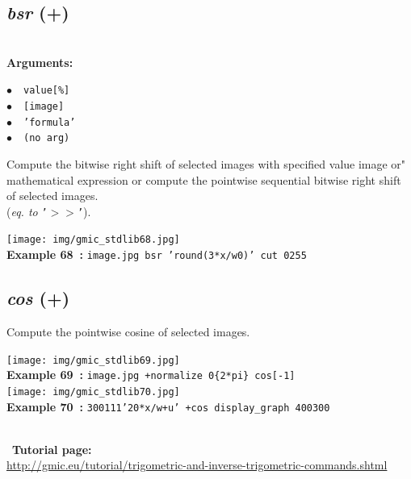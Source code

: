 \documentclass[a4paper,10.5pt,twoside]{book}
\def\comma{\discretionary{,}{}{,}}
\newcommand{\Cb}[1]{\textcolor{cb}{#1}}
\begin{document}
\subsection{\emph{bsr} (+)}\vspace*{-0.7em}
~\\\textbf{\Cb{Arguments: }}\begin{flushleft}
{\small \Cb{\hspace*{0.5cm}$\bullet$~~\texttt{value[\%]}}}~~~\\
{\small \Cb{\hspace*{0.5cm}$\bullet$~~\texttt{[image]}}}~~~\\
{\small \Cb{\hspace*{0.5cm}$\bullet$~~\texttt{'formula'}}}~~~\\
{\small \Cb{\hspace*{0.5cm}$\bullet$~~\texttt{(no arg)}}}\end{flushleft}
Compute the bitwise right shift of selected images with specified value{\comma} image or"
mathematical expression{\comma} or compute the pointwise sequential bitwise right shift of
selected images.
~\\(\emph{eq. to} {\small \texttt{'$>$$>$'}}).
\begin{center}\texttt{[image: img/gmic\_stdlib68.jpg]}\\
{\footnotesize \textbf{Example 68~:} \texttt{image.jpg bsr 'round(3*x/w{\comma}0)' cut 0{\comma}255}}
\end{center}

\subsection{\emph{cos} (+)}\vspace*{-0.7em}
Compute the pointwise cosine of selected images.
\begin{center}\texttt{[image: img/gmic\_stdlib69.jpg]}\\
{\footnotesize \textbf{Example 69~:} \texttt{image.jpg +normalize 0{\comma}\{2*pi\} cos[-1]}}
\\\texttt{[image: img/gmic\_stdlib70.jpg]}\\
{\footnotesize \textbf{Example 70~:} \texttt{300{\comma}1{\comma}1{\comma}1{\comma}'20*x/w+u' +cos display\_graph 400{\comma}300}}
\end{center}
~\\
~\textbf{Tutorial page: }\\\url{http://gmic.eu/tutorial/trigometric-and-inverse-trigometric-commands.shtml}
\end{document}
